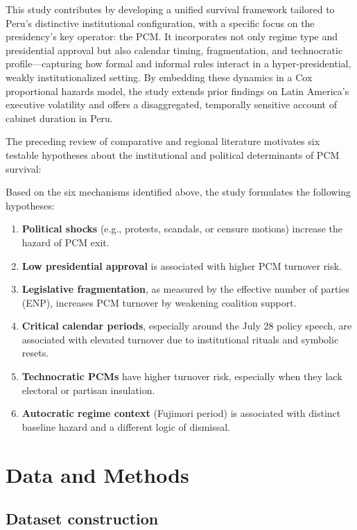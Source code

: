 \documentclass[a4paper, 12pt]{article}
\begin{document}
This study contributes by developing a unified survival framework tailored to Peru’s distinctive institutional configuration, with a specific focus on the presidency's key operator: the PCM. It incorporates not only regime type and presidential approval but also calendar timing, fragmentation, and technocratic profile—capturing how formal and informal rules interact in a hyper-presidential, weakly institutionalized setting. By embedding these dynamics in a Cox proportional hazards model, the study extends prior findings on Latin America’s executive volatility and offers a disaggregated, temporally sensitive account of cabinet duration in Peru.

The preceding review of comparative and regional literature motivates six testable hypotheses about the institutional and political determinants of PCM survival:

\vspace{1em}
Based on the six mechanisms identified above, the study formulates the following hypotheses:

\begin{enumerate}[label=H\arabic*.]
    \item \textbf{Political shocks} (e.g., protests, scandals, or censure motions) increase the hazard of PCM exit.
    \item \textbf{Low presidential approval} is associated with higher PCM turnover risk.
    \item \textbf{Legislative fragmentation}, as measured by the effective number of parties (ENP), increases PCM turnover by weakening coalition support.
    \item \textbf{Critical calendar periods}, especially around the July 28 policy speech, are associated with elevated turnover due to institutional rituals and symbolic resets.
    \item \textbf{Technocratic PCMs} have higher turnover risk, especially when they lack electoral or partisan insulation.
    \item \textbf{Autocratic regime context} (Fujimori period) is associated with distinct baseline hazard and a different logic of dismissal.
\end{enumerate}




\section{Data and Methods}

\subsection{Dataset construction}
\end{document}
